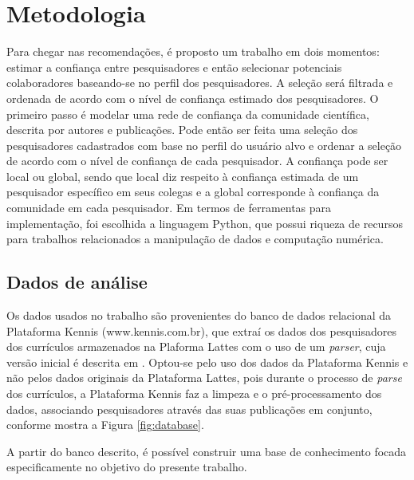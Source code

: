 \documentclass[12pt]{article}
\begin{document}
\section{Metodologia}

Para chegar nas recomendações, é proposto um trabalho em dois momentos: estimar a confiança entre pesquisadores e então
selecionar potenciais colaboradores baseando-se no perfil dos pesquisadores. A seleção será filtrada e ordenada de acordo com o 
nível de confiança estimado dos pesquisadores. O primeiro passo é modelar uma rede de confiança da comunidade científica, descrita 
por autores e publicações. Pode então ser feita uma seleção dos pesquisadores cadastrados com base no perfil do usuário alvo e 
ordenar a seleção de acordo com o nível de confiança de cada pesquisador. A confiança pode ser local ou global, sendo que local diz 
respeito à confiança estimada de um pesquisador específico em seus colegas e a global corresponde à confiança da comunidade em 
cada pesquisador. Em termos de ferramentas para implementação, foi escolhida a linguagem Python, que possui riqueza de 
recursos para trabalhos relacionados a manipulação de dados e computação numérica.%

\subsection{Dados de análise}

Os dados usados no trabalho são provenientes do banco de dados relacional da Plataforma Kennis (www.kennis.com.br), que extraí os 
dados dos pesquisadores dos currículos armazenados na Plaforma Lattes com o uso de um \textit{parser}, cuja versão inicial é 
descrita em \cite{prass2019parser}. Optou-se pelo uso dos dados da Plataforma Kennis e não pelos dados originais da Plataforma 
Lattes, pois durante o processo de \textit{parse} dos currículos, a Plataforma Kennis faz a limpeza e o pré-processamento dos 
dados, associando pesquisadores através das suas publicações em conjunto, conforme mostra a Figura \ref{fig:database}. 

A partir do banco descrito, é possível construir uma base de conhecimento focada especificamente no objetivo do presente trabalho.
\end{document}
